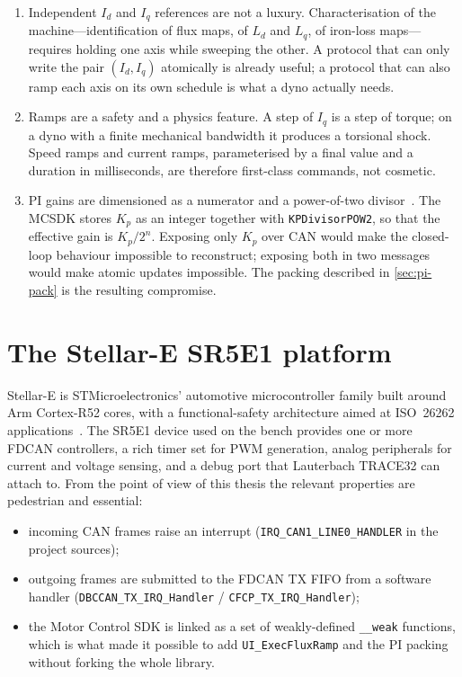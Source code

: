 \begin{enumerate}[leftmargin=1.6em]
  \item Independent $I_d$ and $I_q$ references are not a luxury. Characterisation
        of the machine---identification of flux maps, of $L_d$ and $L_q$, of
        iron-loss maps---requires holding one axis while sweeping the other.
        A protocol that can only write the pair $(I_d,I_q)$ atomically is
        already useful; a protocol that can also ramp each axis on its own
        schedule is what a dyno actually needs.
  \item Ramps are a safety and a physics feature. A step of $I_q$ is a step
        of torque; on a dyno with a finite mechanical bandwidth it produces
        a torsional shock. Speed ramps and current ramps, parameterised by
        a final value and a duration in milliseconds, are therefore
        first-class commands, not cosmetic.
  \item PI gains are dimensioned as a numerator and a power-of-two
        divisor~\cite{astromhagglund2006}. The MCSDK stores
        $K_p$ as an integer together with
        \texttt{KPDivisorPOW2}, so that the effective gain is
        $K_p / 2^{n}$. Exposing only $K_p$ over CAN would make the
        closed-loop behaviour impossible to reconstruct; exposing both in
        two messages would make atomic updates impossible. The packing
        described in \cref{sec:pi-pack} is the resulting compromise.
\end{enumerate}

\section{The Stellar-E SR5E1 platform}
\label{sec:stellar}

Stellar-E is STMicroelectronics' automotive microcontroller family built
around Arm Cortex-R52 cores, with a functional-safety architecture aimed at
ISO~26262 applications~\cite{ststellar}. The SR5E1 device used on the bench
provides one or more FDCAN controllers, a rich timer set for PWM
generation, analog peripherals for current and voltage sensing, and a debug
port that Lauterbach TRACE32 can attach to. From the point of view of this
thesis the relevant properties are pedestrian and essential:

\begin{itemize}[leftmargin=1.6em]
  \item incoming CAN frames raise an interrupt
        (\texttt{IRQ\_CAN1\_LINE0\_HANDLER} in the project sources);
  \item outgoing frames are submitted to the FDCAN TX FIFO from a software
        handler (\texttt{DBCCAN\_TX\_IRQ\_Handler} /
        \texttt{CFCP\_TX\_IRQ\_Handler});
  \item the Motor Control SDK is linked as a set of weakly-defined
        \texttt{\_\_weak} functions, which is what made it possible to add
        \texttt{UI\_ExecFluxRamp} and the PI packing without forking the
        whole library.
\end{itemize}

